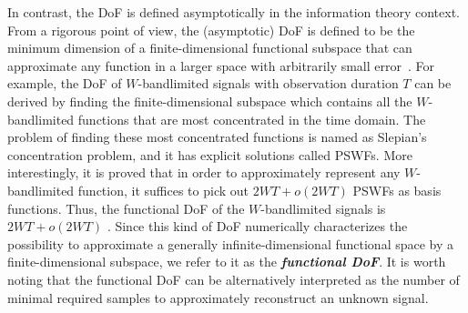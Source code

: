 \documentclass[journal,twocolumn]{IEEEtran}
\begin{document}
In contrast, the DoF is defined asymptotically in the information theory context. From a rigorous point of view, the (asymptotic) DoF is defined to be the minimum dimension of a finite-dimensional functional subspace that can approximate any function in a larger space with arbitrarily small error~\cite{poon2005degrees}. For example, the DoF of $W$-bandlimited signals with observation duration $T$ can be derived by finding the finite-dimensional subspace which contains all the $W$-bandlimited functions that are most concentrated in the time domain. The problem of finding these most concentrated functions is named as Slepian's concentration problem, and it has explicit solutions called PSWFs.
More interestingly, it is proved that in order to approximately represent any $W$-bandlimited function, it suffices to pick out $2WT+o(2WT)$ PSWFs as basis functions. Thus, the functional DoF of the $W$-bandlimited signals is $2WT+o(2WT)$ \cite{slepian1976bandwidth}. 
Since this kind of DoF numerically characterizes the possibility to approximate a generally infinite-dimensional functional space by a finite-dimensional subspace, we refer to it as the {\textbf{\emph{functional DoF}}}. 
It is worth noting that the functional DoF can be alternatively interpreted as the number of minimal required samples to approximately reconstruct an unknown signal. 


\end{document}
